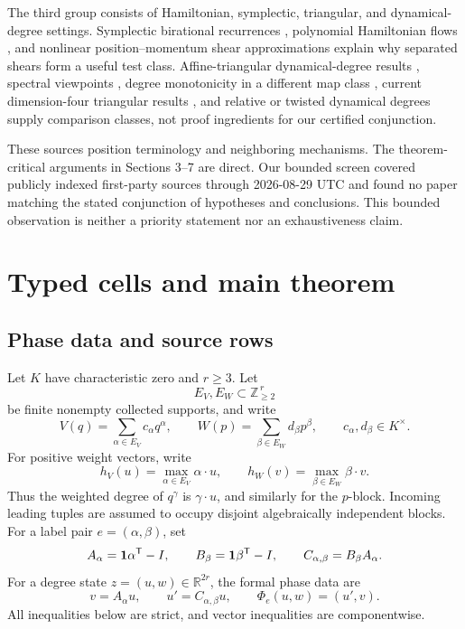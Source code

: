 \documentclass[11pt]{article}
\theoremstyle{definition}
\theoremstyle{remark}
\begin{document}
The third group consists of Hamiltonian, symplectic, triangular, and
dynamical-degree settings.  Symplectic birational recurrences
\cite{fordy_hone_2011}, polynomial Hamiltonian flows
\cite{koch_lomeli_2014}, and nonlinear position--momentum shear
approximations \cite{berger_turaev_2025} explain why separated shears form
a useful test class.  Affine-triangular dynamical-degree results
\cite{blanc_van_santen_2022}, spectral viewpoints
\cite{dang_favre_2021}, degree monotonicity in a different map class
\cite{bianchi_dinh_rakhimov_2024}, current dimension-four triangular
results \cite{shao_sun_2025}, and relative or twisted dynamical degrees
\cite{abboud_xie_2026} supply comparison classes, not proof ingredients for
our certified conjunction.

These sources position terminology and neighboring mechanisms.  The
theorem-critical arguments in Sections 3--7 are direct.  Our bounded screen
covered publicly indexed first-party sources through 2026-08-29 UTC and
found no paper matching the stated conjunction of hypotheses and
conclusions.  This bounded observation is neither a priority statement nor
an exhaustiveness claim.

\section{Typed cells and main theorem}

\subsection{Phase data and source rows}

Let \(K\) have characteristic zero and \(r\geq3\).  Let
\[
 E_V,E_W\subset\mathbb Z_{\geq2}^{\,r}
\]
be finite nonempty collected supports, and write
\[
 V(q)=\sum_{\alpha\in E_V}c_\alpha q^\alpha,\qquad
 W(p)=\sum_{\beta\in E_W}d_\beta p^\beta,
 \qquad c_\alpha,d_\beta\in K^\times .
\]
For positive weight vectors, write
\[
 h_V(u)=\max_{\alpha\in E_V}\alpha\cdot u,\qquad
 h_W(v)=\max_{\beta\in E_W}\beta\cdot v.
\tag{3.1}
\]
Thus the weighted degree of \(q^\gamma\) is \(\gamma\cdot u\), and
similarly for the \(p\)-block.
Incoming leading tuples are assumed to occupy disjoint algebraically
independent blocks.  For a label pair \(e=(\alpha,\beta)\), set
\[
 A_\alpha=\mathbf{1}\alpha^{\mathsf{T}}-I,\qquad
 B_\beta=\mathbf{1}\beta^{\mathsf{T}}-I,\qquad
 C_{\alpha,\beta}=B_\beta A_\alpha .
\]
For a degree state \(z=(u,w)\in\mathbb R^{2r}\), the formal phase data are
\[
 v=A_\alpha u,\qquad u'=C_{\alpha,\beta}u,\qquad
 \Phi_e(u,w)=(u',v).
\tag{3.2}
\]
All inequalities below are strict, and vector inequalities are
componentwise.
\end{document}

